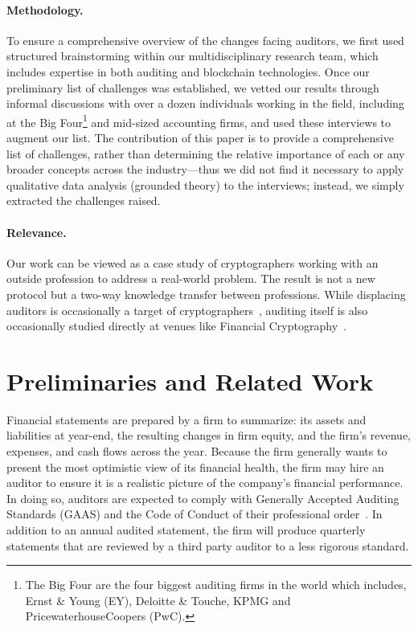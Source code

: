 \paragraph{\textbf{Methodology.}} To ensure a comprehensive overview of the changes facing auditors, we first used structured brainstorming within our multidisciplinary research team, which includes expertise in both auditing and blockchain technologies. Once our preliminary list of challenges was established, we vetted our results through informal discussions with over a dozen individuals working in the field, including at the Big Four\footnote{The Big Four are the four biggest auditing firms in the world which includes, Ernst \& Young (EY), Deloitte \& Touche, KPMG and PricewaterhouseCoopers (PwC).} and mid-sized accounting firms, and used these interviews to augment our list. The contribution of this paper is to provide a comprehensive list of challenges, rather than determining the relative importance of each or any broader concepts across the industry---thus we did not find it necessary to apply qualitative data analysis (\eg grounded theory) to the interviews; instead, we simply extracted the challenges raised.


\paragraph{\textbf{Relevance.}} Our work can be viewed as a case study of cryptographers working with an outside profession to address a real-world problem. The result is not a new protocol but a two-way knowledge transfer between professions. While displacing auditors is occasionally a target of cryptographers~\cite{dagher2015provisions,narula2018zkledger}, auditing itself is also occasionally studied directly at venues like Financial Cryptography~\cite{Swi97,BFS98,grigg2000financial}.



\section{Preliminaries and Related Work}
Financial statements are prepared by a firm to summarize: its assets and liabilities at year-end, the resulting changes in firm equity, and the firm{'}s revenue, expenses, and cash flows across the year. Because the firm generally wants to present the most optimistic view of its financial health, the firm may hire an auditor to ensure it is a realistic picture of the company{'}s financial performance. In doing so, auditors are expected to comply with Generally Accepted Auditing Standards (GAAS) and the Code of Conduct of their professional order~\cite{strother1975establishment}. In addition to an annual audited statement, the firm will produce quarterly statements that are reviewed by a third party auditor to a less rigorous standard.


